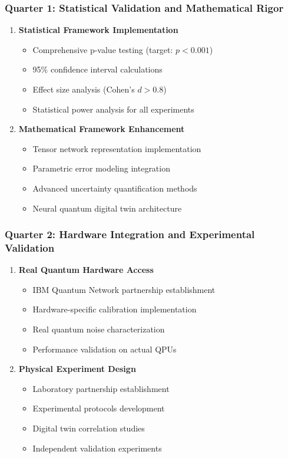 \documentclass[12pt,a4paper]{article}
\begin{document}
\subsubsection{Quarter 1: Statistical Validation and Mathematical Rigor}
\begin{enumerate}
    \item \textbf{Statistical Framework Implementation}
    \begin{itemize}
        \item Comprehensive p-value testing (target: $p < 0.001$)
        \item 95\% confidence interval calculations
        \item Effect size analysis (Cohen's $d > 0.8$)
        \item Statistical power analysis for all experiments
    \end{itemize}
    
    \item \textbf{Mathematical Framework Enhancement}
    \begin{itemize}
        \item Tensor network representation implementation
        \item Parametric error modeling integration
        \item Advanced uncertainty quantification methods
        \item Neural quantum digital twin architecture
    \end{itemize}
\end{enumerate}

\subsubsection{Quarter 2: Hardware Integration and Experimental Validation}
\begin{enumerate}
    \item \textbf{Real Quantum Hardware Access}
    \begin{itemize}
        \item IBM Quantum Network partnership establishment
        \item Hardware-specific calibration implementation
        \item Real quantum noise characterization
        \item Performance validation on actual QPUs
    \end{itemize}
    
    \item \textbf{Physical Experiment Design}
    \begin{itemize}
        \item Laboratory partnership establishment
        \item Experimental protocols development
        \item Digital twin correlation studies
        \item Independent validation experiments
    \end{itemize}
\end{enumerate}
\end{document}
